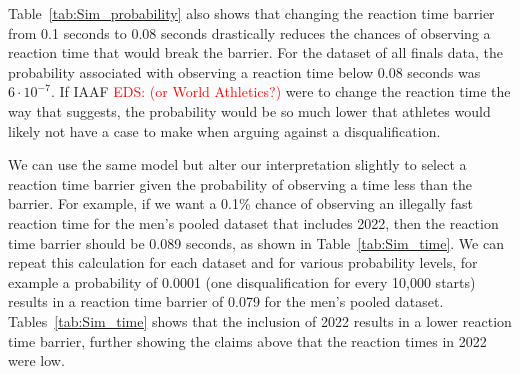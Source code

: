\documentclass[12pt, letterpaper, titlepage]{article}
\newcommand{\eds}[1]{\textcolor{red}{EDS: (#1)}}
\begin{document}
Table~\ref{tab:Sim_probability} also shows that changing the reaction time 
barrier from 0.1 seconds to 0.08 seconds drastically reduces the chances of 
observing a reaction time that would break the barrier.  For the dataset of all 
finals data, the probability
associated with observing a reaction time below 0.08 seconds was $6\cdot10^{-7}$.
If IAAF \eds{or World Athletics?} were to change the reaction time the way that 
\citet{komi2009iaaf}
suggests, the probability would be so much lower that athletes would likely not
have a case to make when arguing against a disqualification.

We can use the same model but alter our interpretation slightly to select a 
reaction time barrier given the probability of observing a time less than the 
barrier.  For example, if we want a 0.1\% chance of observing an illegally fast 
reaction time for the men's pooled dataset that includes 2022, then the reaction
time barrier should be 0.089 seconds, as shown in Table~\ref{tab:Sim_time}.  We
can repeat this calculation for each dataset and for various probability levels,
for example a probability of 0.0001 (one disqualification for every 10,000 starts)
results in a reaction time barrier of 0.079 for the men's pooled dataset.  
Tables~\ref{tab:Sim_time} shows that the inclusion of 2022 results in a lower
reaction time barrier, further showing the claims above that the reaction times
in 2022 were low.

\end{document}
